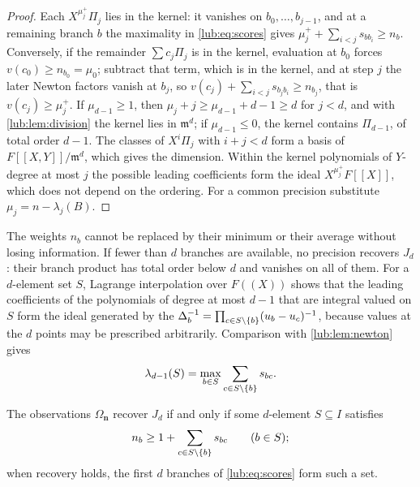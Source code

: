 \begin{proof}
Each $X^{\mu_j^+}\Pi_j$ lies in the kernel: it vanishes on $b_0,\dots,b_{j-1}$, and at a remaining
branch $b$ the maximality in \eqref{lub:eq:scores} gives $\mu_j^++\sum_{i<j}s_{bb_i}\ge n_b$. Conversely,
if the remainder $\sum c_j\Pi_j$ is in the kernel, evaluation at $b_0$ forces $v(c_0)\ge n_{b_0}=\mu_0$;
subtract that term, which is in the kernel, and at step $j$ the later Newton factors vanish at $b_j$,
so $v(c_j)+\sum_{i<j}s_{b_jb_i}\ge n_{b_j}$, that is $v(c_j)\ge\mu_j^+$. If $\mu_{d-1}\ge1$, then
$\mu_j+j\ge\mu_{d-1}+d-1\ge d$ for $j<d$, and with \cref{lub:lem:division} the kernel lies in
$\mathfrak m^d$; if $\mu_{d-1}\le0$, the kernel contains $\Pi_{d-1}$, of total order $d-1$. The classes of
$X^i\Pi_j$ with $i+j<d$ form a basis of $F[[X,Y]]/\mathfrak m^d$, which gives the dimension. Within the
kernel polynomials of $Y$-degree at most $j$ the possible leading coefficients form the ideal
$X^{\mu_j^+}F[[X]]$, which does not depend on the ordering. For a common precision substitute
$\mu_j=n-\lambda_j(B)$.
\end{proof}

The weights $n_b$ cannot be replaced by their minimum or their average without losing information.
If fewer than $d$ branches are available, no precision recovers $J_d$: their branch product
has total order below $d$ and vanishes on all of them. For a $d$-element set $S$, Lagrange
interpolation over $F((X))$ shows that the leading coefficients of the polynomials of degree
at most $d-1$ that are integral valued on $S$ form the ideal generated by the
$\Delta_b^{-1}=\prod_{c\in S\setminus\{b\}}(u_b-u_c)^{-1}$, because values at the $d$
points may be prescribed arbitrarily. Comparison with \cref{lub:lem:newton} gives
\begin{equation}\label{lub:eq:lastfactorial}
 \lambda_{d-1}(S)=\max_{b\in S}\sum_{c\in S\setminus\{b\}}s_{bc}.
\end{equation}

\begin{corollary}\label{lub:cor:certificate}
The observations $\Omega_{\mathbf n}$ recover $J_d$ if and only if some $d$-element $S\subseteq I$
satisfies
\begin{equation}\label{lub:eq:certificate}
 n_b\ge1+\sum_{c\in S\setminus\{b\}}s_{bc}\qquad(b\in S);
\end{equation}
when recovery holds, the first $d$ branches of \eqref{lub:eq:scores} form such a set.
\end{corollary}

